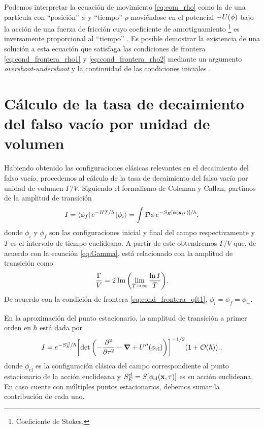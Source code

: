 Podemos interpretar la ecuación de movimiento \eqref{eq:eom_rho} como la de una partícula con ``posición'' $\phi$ y ``tiempo'' $\rho$ moviéndose en el potencial $-U\qty(\phi)$ bajo la acción de una fuerza de fricción cuyo coeficiente de amortiguamiento \footnote{Coeficiente de Stokes.} es inversamente proporcional al ``tiempo'' \cite{weinberg2012classical}. 
Es posible demostrar la existencia de una solución a esta ecuación que satisfaga las condiciones de frontera \eqref{eq:cond_frontera_rho1} y \eqref{eq:cond_frontera_rho2} mediante un argumento \emph{overshoot-undershoot} y la continuidad de las condiciones iniciales  \cite{coleman1977fate}.
%

\section{Cálculo de la tasa de decaimiento del falso vacío por unidad de volumen}

Habiendo obtenido las configuraciones clásicas relevantes en el decaimiento del falso vacío, procedemos al cálculo de la tasa de decaimiento del falso vacío por unidad de volumen $\Gamma/V$. Siguiendo el formalismo de Coleman y Callan, partimos de la amplitud de transición 
\begin{equation}
I = \bra{\phi_f}e^{-HT/\hbar}\ket{\phi_i} = \int \mathcal{D}\phi \, e^{-S_E\qty[\phi\qty(\vb{x},\tau)]/\hbar},
\end{equation}
donde $\phi_i$ y $\phi_f$ son las configuraciones inicial y final del campo respectivamente y $T$ es el intervalo de tiempo euclideano. A partir de este obtendremos $\Gamma/V$ que, de acuerdo con la ecuación \eqref{eq:Gamma}, está relacionado con la amplitud de transición como
\begin{equation} \label{eq:Gamma/V_amplitud}
\frac{\Gamma}{V} = 2\Im\qty(\lim_{T \rightarrow \infty} \frac{ \ln I}{T}).
\end{equation}
De acuerdo con la condición de frontera \eqref{eq:cond_frontera_qft1}, $\phi_i = \phi_f = \phi_+$. 

En la aproximación del punto estacionario, la amplitud de transición a primer orden en $\hbar$ está dada por
\begin{equation} \label{eq:I_phi}
I = e^{-S_E^{\textrm{cl}} / \hbar} \qty[ \det\left(-\pdv[2]{\tau} -\grad{} + U''\qty(\phi_{\textrm{cl}}) \right) ]^{-1/2} \qty(1 + \order{\hbar}).,
\end{equation}
donde $\phi_{\textrm{cl}}$ es la configuración clásica del campo correspondiente al punto estacionario de la acción euclideana y $S_E^{\textrm{cl}} = S[\phi_{\textrm{cl}}\qty(\vb{x}, \tau)]$ es su acción euclideana. En caso cuente con múltiples puntos estacionarios, debemos sumar la contribución de cada uno. 

